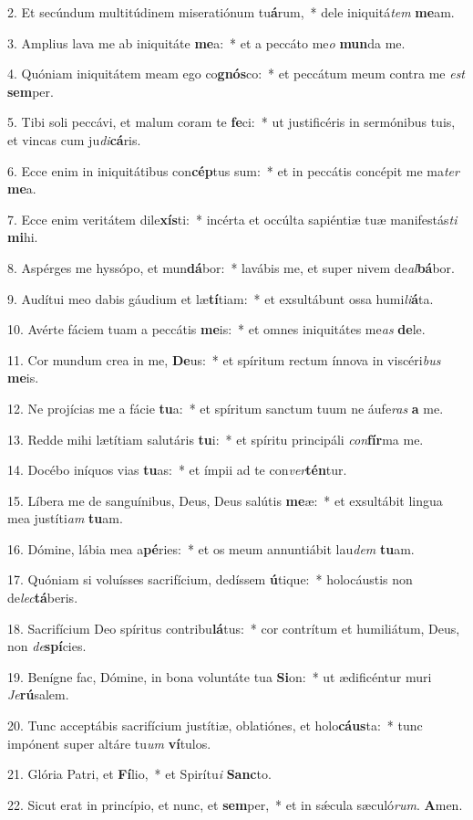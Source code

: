 
2. Et secúndum multitúdinem miseratiónum tu\textbf{á}rum,~* dele iniquitá\textit{tem} \textbf{me}am.

3. Amplius lava me ab iniquitáte \textbf{me}a:~* et a peccáto me\textit{o} \textbf{mun}da me.

4. Quóniam iniquitátem meam ego co\textbf{gnós}co:~* et peccátum meum contra me \textit{est} \textbf{sem}per.

5. Tibi soli peccávi, et malum coram te \textbf{fe}ci:~* ut justificéris in sermónibus tuis, et vincas cum ju\textit{di}\textbf{cá}ris.

6. Ecce enim in iniquitátibus con\textbf{cép}tus sum:~* et in peccátis concépit me ma\textit{ter} \textbf{me}a.

7. Ecce enim veritátem dile\textbf{xís}ti:~* incérta et occúlta sapiéntiæ tuæ manifestás\textit{ti} \textbf{mi}hi.

8. Aspérges me hyssópo, et mun\textbf{dá}bor:~* lavábis me, et super nivem de\textit{al}\textbf{bá}bor.

9. Audítui meo dabis gáudium et læ\textbf{tí}tiam:~* et exsultábunt ossa humi\textit{li}\textbf{á}ta.

10. Avérte fáciem tuam a peccátis \textbf{me}is:~* et omnes iniquitátes me\textit{as} \textbf{de}le.

11. Cor mundum crea in me, \textbf{De}us:~* et spíritum rectum ínnova in viscéri\textit{bus} \textbf{me}is.

12. Ne projícias me a fácie \textbf{tu}a:~* et spíritum sanctum tuum ne áufe\textit{ras} \textbf{a} me.

13. Redde mihi lætítiam salutáris \textbf{tu}i:~* et spíritu principáli \textit{con}\textbf{fír}ma me.

14. Docébo iníquos vias \textbf{tu}as:~* et ímpii ad te con\textit{ver}\textbf{tén}tur.

15. Líbera me de sanguínibus, Deus, Deus salútis \textbf{me}æ:~* et exsultábit lingua mea justíti\textit{am} \textbf{tu}am.

16. Dómine, lábia mea a\textbf{pé}ries:~* et os meum annuntiábit lau\textit{dem} \textbf{tu}am.

17. Quóniam si voluísses sacrifícium, dedíssem \textbf{ú}tique:~* holocáustis non de\textit{lec}\textbf{tá}beris.

18. Sacrifícium Deo spíritus contribu\textbf{lá}tus:~* cor contrítum et humiliátum, Deus, non \textit{de}\textbf{spí}cies.

19. Benígne fac, Dómine, in bona voluntáte tua \textbf{Si}on:~* ut ædificéntur muri \textit{Je}\textbf{rú}salem.

20. Tunc acceptábis sacrifícium justítiæ, oblatiónes, et holo\textbf{cáus}ta:~* tunc impónent super altáre tu\textit{um} \textbf{ví}tulos.

21. Glória Patri, et \textbf{Fí}lio,~* et Spirítu\textit{i} \textbf{Sanc}to.

22. Sicut erat in princípio, et nunc, et \textbf{sem}per,~* et in s\'{\ae}cula sæculó\textit{rum}. \textbf{A}men.